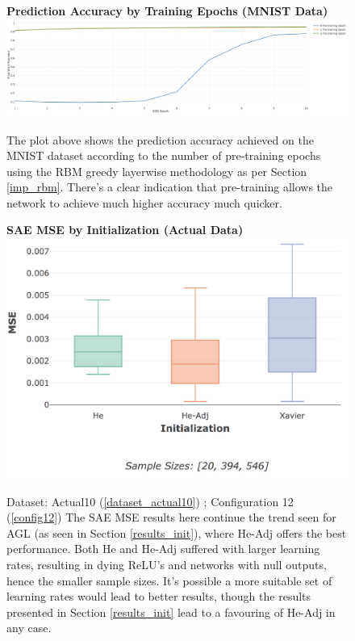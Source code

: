 \documentclass[a4paper,11pt,oneside]{article}
\theoremstyle{plain}
\theoremstyle{definition}
\begin{document}
	\begin{figure}[H]
		\centering 
		\textbf{Prediction Accuracy by Training Epochs (MNIST Data)} 
		\includegraphics[scale=0.2]{images/results/8_appendix/rbm_pretraining.png}
		\caption[Prediction Accuracy by Training Epochs (MNIST Data)]{The plot above shows the prediction accuracy achieved on the MNIST dataset according to the number of pre-training epochs using the RBM greedy layerwise methodology as per Section \ref{imp_rbm}. There's a clear indication that pre-training allows the network to achieve much higher accuracy much quicker.}
		\label{figure-rbm_pretraining}
	\end{figure}
	
	\begin{figure}[H]
		\centering 
		\textbf{SAE MSE by Initialization (Actual Data)} 
		\includegraphics[scale=0.3]{images/results/8_appendix/actual_mse_init.png}
		\caption[SAE MSE by Initialization (Actual Data)]{Dataset: Actual10 (\ref{dataset_actual10}) ; Configuration 12 (\ref{config12})
			\newline The SAE MSE results here continue the trend seen for AGL (as seen in Section \ref{results_init}), where He-Adj offers the best performance. Both He and He-Adj suffered with larger learning rates, resulting in dying ReLU's and networks with null outputs, hence the smaller sample sizes. It's possible a more suitable set of learning rates would lead to better results, though the results presented in Section \ref{results_init} lead to a favouring of He-Adj in any case.}
		\label{figure-actual_mse_init}
	\end{figure}
	
\end{document}
